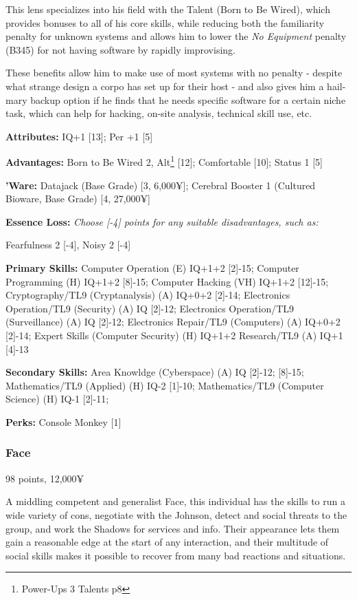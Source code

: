 \begin{multicols}{2}
	This lens specializes into his field with the Talent (Born to Be Wired), which provides bonuses to all of his core skills, while reducing both the familiarity penalty for unknown systems and allows him to lower the \textit{No Equipment} penalty (B345) for not having software by rapidly improvising. 
	
	These benefits allow him to make use of most systems with no penalty - despite what strange design a corpo has set up for their host - and also gives him a hail-mary backup option if he finds that he needs specific software for a certain niche task, which can help for hacking, on-site analysis, technical skill use, etc.
	
	\textbf{Attributes:}
	IQ+1 [13]; Per +1 [5]
	
	\textbf{Advantages:}
	Born to Be Wired 2, Alt\footnote{Power-Ups 3 Talents p8} [12]; Comfortable [10]; Status 1 [5]
	
	\textbf{'Ware:}
	Datajack (Base Grade) [3, 6,000¥]; Cerebral Booster 1 (Cultured Bioware, Base Grade) [4, 27,000¥]
	
	\textbf{Essence Loss:}
	\textit{Choose [-4] points for any suitable disadvantages, such as:}
	
	Fearfulness 2 [-4], Noisy 2 [-4]	
	
	\textbf{Primary Skills:}
	Computer Operation (E) IQ+1+2 [2]-15; Computer Programming (H) IQ+1+2 [8]-15; Computer Hacking (VH) IQ+1+2 [12]-15; Cryptography/TL9 (Cryptanalysis) (A) IQ+0+2 [2]-14; Electronics Operation/TL9 (Security) (A) IQ [2]-12; Electronics Operation/TL9 (Surveillance) (A) IQ [2]-12; Electronics Repair/TL9 (Computers) (A) IQ+0+2 [2]-14; Expert Skills (Computer Security) (H) IQ+1+2  Research/TL9 (A) IQ+1 [4]-13
	
	\textbf{Secondary Skills:}
	Area Knowldge (Cyberspace) (A) IQ [2]-12; [8]-15; Mathematics/TL9 (Applied) (H) IQ-2 [1]-10; Mathematics/TL9 (Computer Science) (H) IQ-1 [2]-11;
	
	\textbf{Perks:}
	Console Monkey [1]
	
	\subsubsection{Face}
	\begin{flushright}
		98 points, 12,000¥
	\end{flushright}
	
	A middling competent and generalist Face, this individual has the skills to run a wide variety of cons, negotiate with the Johnson, detect and social threats to the group, and work the Shadows for services and info. Their appearance lets them gain a reasonable edge at the start of any interaction, and their multitude of social skills makes it possible to recover from many bad reactions and situations.
	

\end{multicols}
